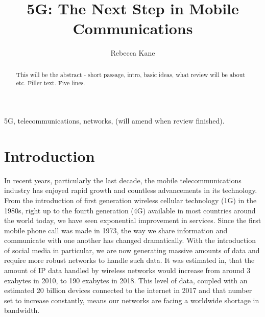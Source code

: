 \documentclass[journal]{IEEEtran}
\begin{document}
\title{5G: The Next Step in Mobile Communications}
\author{Rebecca Kane}


\maketitle

\begin{abstract}
This will be the abstract - short passage, intro, basic ideas, what review will be about etc. Filler text. Five lines.
\end{abstract}
\begin{IEEEkeywords}
5G, telecommunications, networks, (will amend when review finished).
\end{IEEEkeywords}


\section{Introduction}
In recent years, particularly the last decade, the mobile telecommunications industry has enjoyed rapid growth and countless advancements in its technology. From the introduction of first generation wireless cellular technology (1G) in the 1980s, right up to the fourth generation (4G) available in most countries around the world today, we have seen exponential improvement in services. Since the first mobile phone call was made in 1973, the way we share information and communicate with one another has changed dramatically. With the introduction of social media in particular, we are now generating massive amounts of data and require more robust networks to handle such data. It was estimated in\cite{whatwill5gbe}, that the amount of IP data handled by wireless networks would increase from around 3 exabytes in 2010, to 190 exabytes in 2018. This level of data, coupled with an estimated 20 billion devices connected to the internet in 2017\cite{ihsmarkit} and that number set to increase constantly, means our networks are facing a worldwide shortage in bandwidth.

\end{document}
